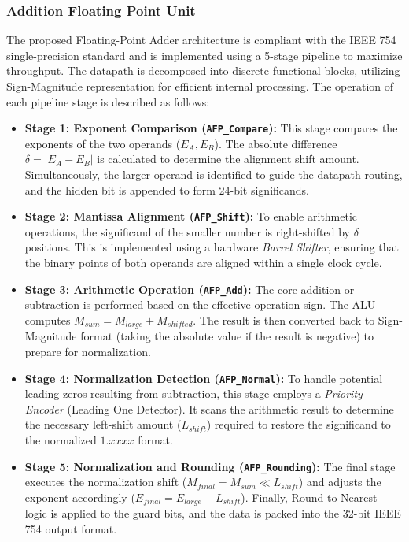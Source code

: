 \subsubsection{Addition Floating Point Unit}

The proposed Floating-Point Adder architecture is compliant with the IEEE 754 single-precision standard and is implemented using a 5-stage pipeline to maximize throughput. The datapath is decomposed into discrete functional blocks, utilizing Sign-Magnitude representation for efficient internal processing. The operation of each pipeline stage is described as follows:

\begin{itemize}
    \item \textbf{Stage 1: Exponent Comparison (\texttt{AFP\_Compare}):} 
    This stage compares the exponents of the two operands ($E_A, E_B$). The absolute difference $\delta = |E_A - E_B|$ is calculated to determine the alignment shift amount. Simultaneously, the larger operand is identified to guide the datapath routing, and the hidden bit is appended to form 24-bit significands.

    \item \textbf{Stage 2: Mantissa Alignment (\texttt{AFP\_Shift}):} 
    To enable arithmetic operations, the significand of the smaller number is right-shifted by $\delta$ positions. This is implemented using a hardware \textit{Barrel Shifter}, ensuring that the binary points of both operands are aligned within a single clock cycle.

    \item \textbf{Stage 3: Arithmetic Operation (\texttt{AFP\_Add}):} 
    The core addition or subtraction is performed based on the effective operation sign. The ALU computes $M_{sum} = M_{large} \pm M_{shifted}$. The result is then converted back to Sign-Magnitude format (taking the absolute value if the result is negative) to prepare for normalization.

    \item \textbf{Stage 4: Normalization Detection (\texttt{AFP\_Normal}):} 
    To handle potential leading zeros resulting from subtraction, this stage employs a \textit{Priority Encoder} (Leading One Detector). It scans the arithmetic result to determine the necessary left-shift amount ($L_{shift}$) required to restore the significand to the normalized $1.xxxx$ format.

    \item \textbf{Stage 5: Normalization and Rounding (\texttt{AFP\_Rounding}):} 
    The final stage executes the normalization shift ($M_{final} = M_{sum} \ll L_{shift}$) and adjusts the exponent accordingly ($E_{final} = E_{large} - L_{shift}$). Finally, Round-to-Nearest logic is applied to the guard bits, and the data is packed into the 32-bit IEEE 754 output format.
\end{itemize}

